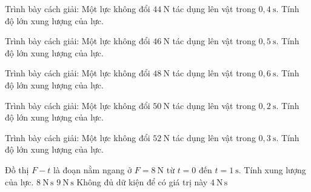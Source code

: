\begin{bt}
Trình bày cách giải: Một lực không đổi $44\ \mathrm{N}$ tác dụng lên vật trong $0,4\ \mathrm{s}$. Tính độ lớn xung lượng của lực.
\end{bt}

\begin{bt}
Trình bày cách giải: Một lực không đổi $46\ \mathrm{N}$ tác dụng lên vật trong $0,5\ \mathrm{s}$. Tính độ lớn xung lượng của lực.
\end{bt}

\begin{bt}
Trình bày cách giải: Một lực không đổi $48\ \mathrm{N}$ tác dụng lên vật trong $0,6\ \mathrm{s}$. Tính độ lớn xung lượng của lực.
\end{bt}

\begin{bt}
Trình bày cách giải: Một lực không đổi $50\ \mathrm{N}$ tác dụng lên vật trong $0,2\ \mathrm{s}$. Tính độ lớn xung lượng của lực.
\end{bt}

\begin{bt}
Trình bày cách giải: Một lực không đổi $52\ \mathrm{N}$ tác dụng lên vật trong $0,3\ \mathrm{s}$. Tính độ lớn xung lượng của lực.
\end{bt}

\begin{ex}
Đồ thị $F-t$ là đoạn nằm ngang ở $F=8\ \mathrm{N}$ từ $t=0$ đến $t=1\ \mathrm{s}$. Tính xung lượng của lực.
\choice
{\True $8\ \mathrm{N\,s}$}
{$9\ \mathrm{N\,s}$}
{Không đủ dữ kiện để có giá trị này}
{$4\ \mathrm{N\,s}$}
\end{ex}

